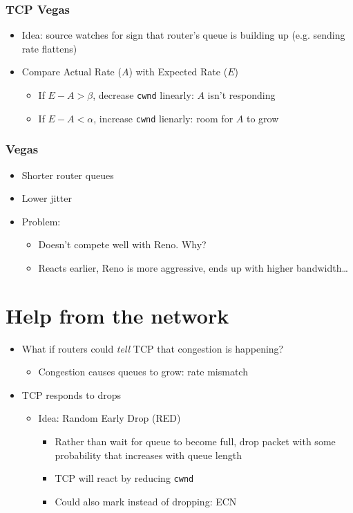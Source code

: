 \subsubsection{TCP Vegas}
\begin{itemize}[nosep]
    \item Idea: source watches for sign that router's queue is building up (e.g. sending rate flattens)
    \item Compare Actual Rate ($A$) with Expected Rate ($E$)
          \begin{itemize}[nosep]
              \item If $E - A > \beta$, decrease \texttt{cwnd} linearly: $A$ isn't responding
              \item If $E - A < \alpha$, increase \texttt{cwnd} lienarly: room for $A$ to grow
          \end{itemize}
\end{itemize}
\subsubsection{Vegas}
\begin{itemize}[nosep]
    \item Shorter router queues
    \item Lower jitter
    \item Problem:
          \begin{itemize}[nosep]
              \item Doesn't compete well with Reno. Why?
              \item Reacts earlier, Reno is more aggressive, ends up with higher bandwidth\dots
          \end{itemize}
\end{itemize}
\section{Help from the network}
\begin{itemize}[nosep]
    \item What if routers could \emph{tell} TCP that congestion is happening?
          \begin{itemize}[nosep]
              \item Congestion causes queues to grow: rate mismatch
          \end{itemize}
    \item TCP responds to drops
          \begin{itemize}[nosep]
              \item Idea: Random Early Drop (RED)
                    \begin{itemize}[nosep]
                        \item Rather than wait for queue to become full, drop packet with some probability that increases with queue length
                        \item TCP will react by reducing \texttt{cwnd}
                        \item Could also mark instead of dropping: ECN
                    \end{itemize}
          \end{itemize}
\end{itemize}

